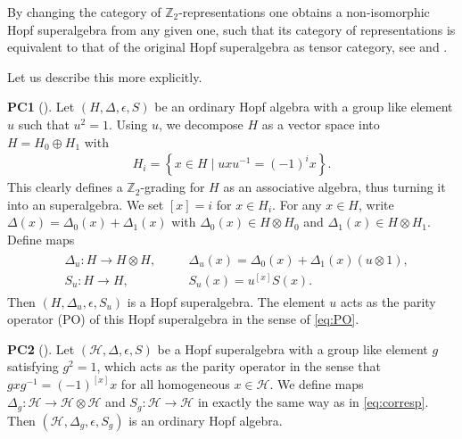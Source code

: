 \documentclass[12pt]{amsart}
\theoremstyle{definition}
\theoremstyle{remark}
\numberwithin{equation}{section}
\begin{document}
By changing the category of ${{\mathbb Z}}_2$-representations one obtains a non-isomorphic Hopf superalgebra from any given one, 
such that its category of representations is equivalent to that of the original Hopf superalgebra as tensor category, see
\cite[Theorem 3.1.1]{AEG}  and \cite[ Chapter 10.1]{Ma}.

 Let us describe this more explicitly.

{\bf PC1} (\cite[Theorem 3.1.1]{AEG}).
Let $(H, \Delta, \epsilon, S)$ be an ordinary Hopf algebra with a group like element $u$ such that $u^2 = 1$. Using $u$, we decompose $H$ as a vector space into
$H=H_0\oplus H_1$ with
\begin{eqnarray}\label{eq:PO}
H_i=\left\{x\in H\mid u x u^{-1} = (-1)^i x\right\}.
\end{eqnarray}
This clearly defines a ${{\mathbb Z}}_2$-grading for $H$ as an associative algebra, thus turning it into an superalgebra.  We set $[x]=i$ for $x\in H_i$.
For any $x\in H$, write $\Delta(x)=\Delta_0(x) + \Delta_1(x)$ with  $\Delta_0(x) \in H\otimes H_0$ and $\Delta_1(x)\in H\otimes H_1$.  Define maps
\begin{eqnarray}\label{eq:corresp}
\begin{aligned}
&\Delta_u: H\longrightarrow H\otimes H, &&\quad \Delta_u(x)=\Delta_0(x) + \Delta_1(x)(u\otimes 1), \\
&S_u: H\longrightarrow H, &&\quad S_u(x) = u^{[x]} S(x).
\end{aligned}
\end{eqnarray}
Then $(H, \Delta_u, \epsilon, S_u)$ is a Hopf superalgebra. The
element $u$ acts as the parity operator (PO) of this Hopf superalgebra in the sense of \eqref{eq:PO}.

{\bf PC2} (\cite[Theorem 3.1.1]{AEG}).
Let $({{\mathscr H}}, \Delta, \epsilon, S)$ be a Hopf superalgebra with a group like element $g$ satisfying $g^2=1$, which acts as the parity operator in the sense that
$g xg^{-1} =(-1)^{[x]} x$ for all homogeneous $x\in {{\mathscr H}}$. We define maps
$\Delta_g: {{\mathscr H}}\longrightarrow {{\mathscr H}}\otimes {{\mathscr H}}$ and $S_g: {{\mathscr H}}\longrightarrow {{\mathscr H}}$ in exactly the same way as in \eqref{eq:corresp}. Then $({{\mathscr H}}, \Delta_g, \epsilon, S_g)$ is an ordinary Hopf algebra.
\end{document}
